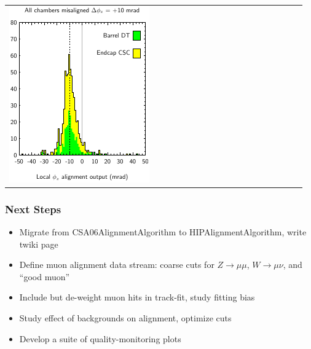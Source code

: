 \documentclass[compress]{beamer}
\begin{document}
\begin{frame}
\begin{tabular}{p{0.48\linewidth} p{0.48\linewidth}}
\begin{minipage}{\linewidth}
    \includegraphics[width=\linewidth]{phiz_alignments_phiz_aspectratio}
  \end{minipage}
\end{tabular}

\end{frame}

\begin{frame}
\frametitle{Next Steps}
\begin{itemize}\setlength{\itemsep}{0.5 cm}
  \item Migrate from CSA06AlignmentAlgorithm to HIPAlignmentAlgorithm, write twiki page
  \item Define muon alignment data stream: coarse cuts for $Z\to\mu\mu$, $W\to\mu\nu$, and ``good muon''
  \item Include but de-weight muon hits in track-fit, study fitting bias
  \item Study effect of backgrounds on alignment, optimize cuts
  \item Develop a suite of quality-monitoring plots
\end{itemize}
\end{frame}
\end{document}
